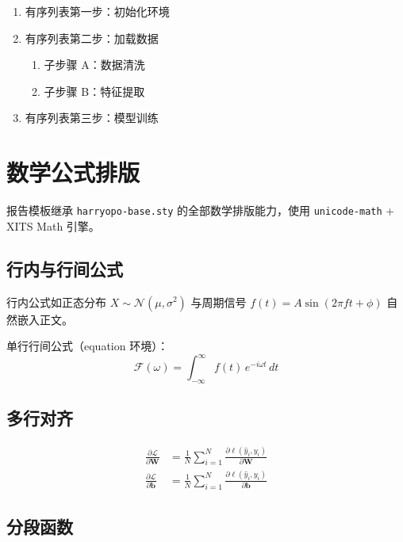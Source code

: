 \documentclass{harryopo-report}
\begin{document}
\begin{enumerate}
    \item 有序列表第一步：初始化环境
    \item 有序列表第二步：加载数据
    \begin{enumerate}
        \item 子步骤 A：数据清洗
        \item 子步骤 B：特征提取
    \end{enumerate}
    \item 有序列表第三步：模型训练
\end{enumerate}

\chapter{数学公式排版}

报告模板继承 \texttt{harryopo-base.sty} 的全部数学排版能力，使用 \texttt{unicode-math} + XITS Math 引擎。

\section{行内与行间公式}

行内公式如正态分布 $X \sim \mathcal{N}(\mu, \sigma^{2})$ 与周期信号 $f(t) = A\sin(2\pi ft + \phi)$ 自然嵌入正文。

单行行间公式（equation 环境）：
\begin{equation}
\mathcal{F}(\omega) = \int_{-\infty}^{\infty} f(t)\,e^{-i\omega t}\,dt
\label{eq:fourier}
\end{equation}

\section{多行对齐}

\begin{align}
\frac{\partial \mathcal{L}}{\partial \mathbf{W}} &= \frac{1}{N} \sum_{i=1}^{N} \frac{\partial \ell(\hat{y}_i, y_i)}{\partial \mathbf{W}} \label{eq:grad_w}\\
\frac{\partial \mathcal{L}}{\partial \mathbf{b}} &= \frac{1}{N} \sum_{i=1}^{N} \frac{\partial \ell(\hat{y}_i, y_i)}{\partial \mathbf{b}} \label{eq:grad_b}
\end{align}

\section{分段函数}
\end{document}
